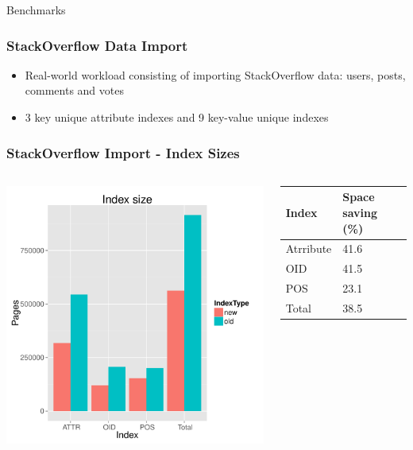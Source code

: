 \documentclass{beamer}
\begin{document}
\begin{section}{Benchmarks}

    \begin{frame}
      \frametitle{StackOverflow Data Import}
        \begin{itemize}
        \item Real-world workload consisting of importing StackOverflow data: users, posts, comments and votes     
        \item 3 key unique attribute indexes and 9 key-value unique indexes
        \end{itemize}
    \end{frame}
    
    \begin{frame}
      \frametitle{StackOverflow Import - Index Sizes}
      
        \begin{columns}[c]
        \column{1.5in}
        \includegraphics[scale=0.28]{images/SO_sizes.pdf} 
        
        \column{1.5in}
        \begin{tabular}{| l | l |}
            \hline
            Index & Space saving (\%) \\ \hline 
            Atrribute & 41.6   \\ \hline 
            OID & 41.5   \\ \hline 
            POS & 23.1   \\ \hline
            Total & 38.5   \\ \hline 
        \end{tabular}
        

\end{columns}
\end{frame}
\end{section}
\end{document}
